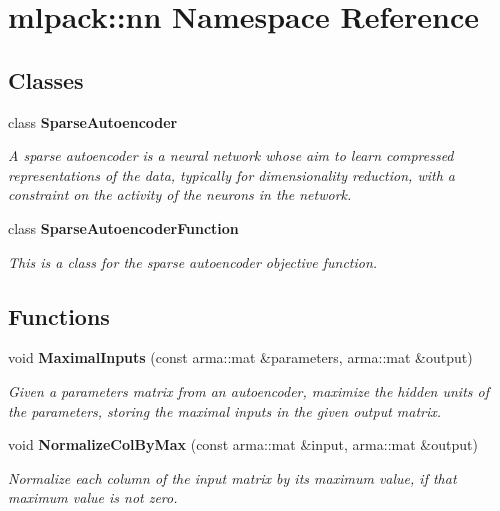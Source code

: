 \section{mlpack\+:\+:nn Namespace Reference}
\label{namespacemlpack_1_1nn}
\subsection*{Classes}
\begin{DoxyCompactItemize}
\item 
class {\bf Sparse\+Autoencoder}
\begin{DoxyCompactList}\small\item\em A sparse autoencoder is a neural network whose aim to learn compressed representations of the data, typically for dimensionality reduction, with a constraint on the activity of the neurons in the network. \end{DoxyCompactList}\item 
class {\bf Sparse\+Autoencoder\+Function}
\begin{DoxyCompactList}\small\item\em This is a class for the sparse autoencoder objective function. \end{DoxyCompactList}\end{DoxyCompactItemize}
\subsection*{Functions}
\begin{DoxyCompactItemize}
\item 
void {\bf Maximal\+Inputs} (const arma\+::mat \&parameters, arma\+::mat \&output)
\begin{DoxyCompactList}\small\item\em Given a parameters matrix from an autoencoder, maximize the hidden units of the parameters, storing the maximal inputs in the given output matrix. \end{DoxyCompactList}\item 
void {\bf Normalize\+Col\+By\+Max} (const arma\+::mat \&input, arma\+::mat \&output)
\begin{DoxyCompactList}\small\item\em Normalize each column of the input matrix by its maximum value, if that maximum value is not zero. \end{DoxyCompactList}\end{DoxyCompactItemize}


